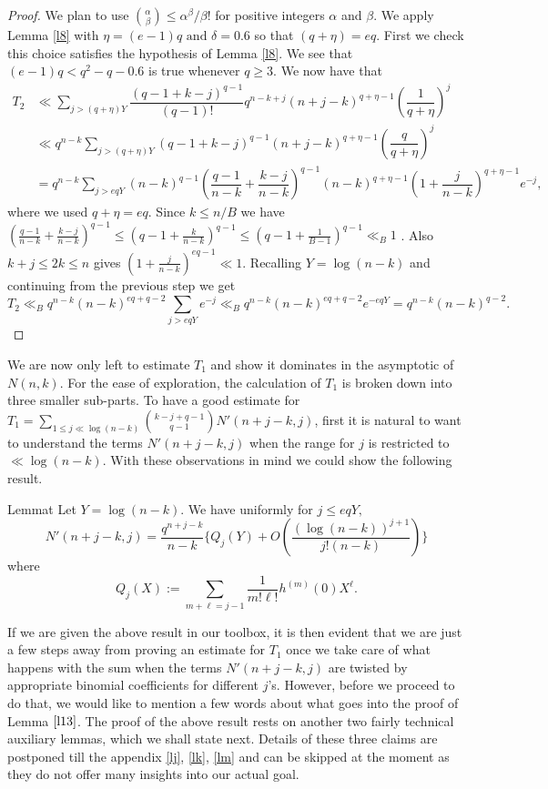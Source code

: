 \documentclass[12pt]{amsart}
\numberwithin{equation}{section}
\theoremstyle{remark}
\theoremstyle{remark}
\theoremstyle{definition}
\begin{document}
\begin{proof}
We plan to use $\displaystyle\binom{\alpha}{\beta}\leqslant {\alpha^\beta}/{\beta!}$ for positive integers $\alpha$ and $\beta$. We apply Lemma \ref{l8} with $\eta=(e-1)q\text{ and }\delta=0.6$ so that $(q+\eta)=eq$. First we check this choice satisfies the hypothesis of Lemma \ref{l8}. We see that $(e-1)q<q^2-q-0.6$ is true whenever $q \geqslant 3$. We now have that
\begin{align}
\nonumber
T_2 &\ll \displaystyle\sum\limits_{j>(q+\eta)Y}\dfrac{(q-1+k-j)^{q-1}}{(q-1)!}q^{n-k+j}(n+j-k)^{q+\eta-1}\left( \dfrac{1}{q+\eta}\right)^j\\
\nonumber
&\ll q^{n-k}\displaystyle\sum\limits_{j>(q+\eta)Y}(q-1+k-j)^{q-1}(n+j-k)^{q+\eta-1}\left( \dfrac{q}{q+\eta}\right)^j\\
\nonumber
&= q^{n-k}\displaystyle\sum\limits_{j>eqY}(n-k)^{q-1}{\left(\dfrac{q-1}{n-k}+\dfrac{k-j}{n-k} \right)^{q-1}}(n-k)^{q+\eta-1}\left( 1+\dfrac{j}{n-k}\right)^{q+\eta-1}e^{-j},
\end{align}
where we used $q+\eta =eq$. Since $k\leqslant n/B$ we have $\left(\frac{q-1}{n-k}+\frac{k-j}{n-k}\right)^{q-1}\leqslant \left(q-1+\frac{k}{n-k}\right)^{q-1}\leqslant \left(q-1+\frac{1}{B-1}\right)^{q-1}\ll_{B}1$ . Also $k+j\leqslant 2k\leqslant n$ gives $\left(1+\frac{j}{n-k}\right)^{eq-1}\ll 1$. Recalling $Y=\log(n-k)$ and continuing from the previous step we get
$$T_2\ll_B q^{n-k}(n-k)^{eq+q-2}\displaystyle\sum\limits_{j>eqY}e^{-j}\ll_B q^{n-k}(n-k)^{eq+q-2}e^{-eqY} = q^{n-k}(n-k)^{q-2}.$$
\end{proof}
We are now only left to estimate $T_1$ and show it dominates in the asymptotic of $N(n,k)$. For the ease of exploration, the calculation of $T_1$ is broken down into three smaller sub-parts. To have a good estimate for $T_1={\sum_{1\leqslant j\ll \log(n-k)}\binom{k-j+q-1}{q-1}N'(n+j-k,j)}$, first it is natural to want to understand the terms $N'(n+j-k,j)$ when the range for $j$ is restricted to $\ll\log (n-k)$. With these observations in mind we could show the following result.
\begin{restatable}{Lemma}{t}\label{l13}
Let $Y=\log(n-k)$. We have uniformly for $j\leqslant eqY,$
$$N'(n+j-k,j)=\dfrac{q^{n+j-k}}{n-k}\Bigg \{ Q_j(Y)+O\left(\dfrac{(\log (n-k))^{j+1}}{j!(n-k)} \right)\Bigg \}$$
where
$$Q_j(X):=\displaystyle\sum\limits_{m+\ell=j-1}\dfrac{1}{m!\ell!}h^{(m)}(0)X^{\ell}.$$
\end{restatable}
If we are given the above result in our toolbox, it is then evident that we are just a few steps away from proving an estimate for $T_1$ once we take care of what happens with the sum when the terms $N'(n+j-k,j)$ are twisted by appropriate binomial coefficients for different $j$'s. However, before we proceed to do that, we would like to mention a few words about what goes into the proof of Lemma $\ref{l13}$. The proof of the above result rests on another two fairly technical auxiliary lemmas, which we shall state next. Details of these three claims are postponed till the appendix \ref{lj}, \ref{lk}, \ref{lm} and can be skipped at the moment as they do not offer many insights into our actual goal. 
\end{document}
